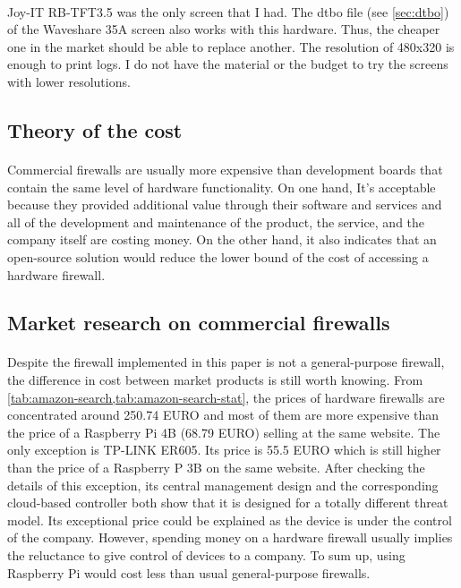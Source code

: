 \documentclass[mscthesis]{usiinfthesis}
\begin{document}
\paragraph{}
Joy-IT RB-TFT3.5 was the only screen that I had. The dtbo file (see \cref{sec:dtbo}) of the Waveshare 35A screen also works with this hardware. Thus, the cheaper one in the market should be able to replace another. The resolution of 480x320 is enough to print logs. I do not have the material or the budget to try the screens with lower resolutions.

\subsection{Theory of the cost}
\paragraph{}
Commercial firewalls are usually more expensive than development boards that contain the same level of hardware functionality. On one hand, It's acceptable because they provided additional value through their software and services and all of the development and maintenance of the product, the service, and the company itself are costing money. On the other hand, it also indicates that an open-source solution would reduce the lower bound of the cost of accessing a hardware firewall.

\subsection{Market research on commercial firewalls}
\paragraph{}
Despite the firewall implemented in this paper is not a general-purpose firewall, the difference in cost between market products is still worth knowing. From \cref{tab:amazon-search,tab:amazon-search-stat}, the prices of hardware firewalls are concentrated around 250.74 EURO and most of them are more expensive than the price of a Raspberry Pi 4B (68.79 EURO) selling at the same website. The only exception is TP-LINK ER605. Its price is 55.5 EURO which is still higher than the price of a Raspberry P 3B on the same website. After checking the details of this exception, its central management design and the corresponding cloud-based controller both show that it is designed for a totally different threat model. Its exceptional price could be explained as the device is under the control of the company. However, spending money on a hardware firewall usually implies the reluctance to give control of devices to a company. To sum up, using Raspberry Pi would cost less than usual general-purpose firewalls.
\end{document}
